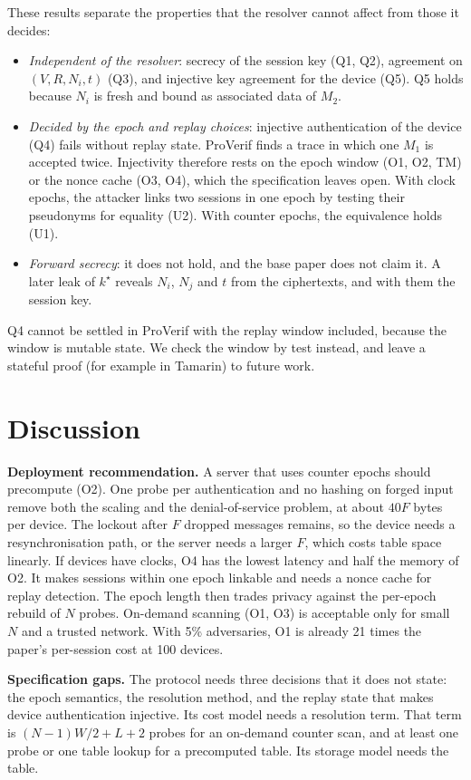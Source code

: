 These results separate the properties that the resolver cannot affect from those it decides:
\begin{itemize}
\item \emph{Independent of the resolver}: secrecy of the session key (Q1, Q2), agreement on $(V,R,N_i,t)$ (Q3), and
injective key agreement for the device (Q5). Q5 holds because $N_i$ is fresh and bound as associated data of $M_2$.
\item \emph{Decided by the epoch and replay choices}: injective authentication of the device (Q4) fails without replay
state. ProVerif finds a trace in which one $M_1$ is accepted twice. Injectivity therefore rests on the epoch window (O1,
O2, TM) or the nonce cache (O3, O4), which the specification leaves open. With clock epochs, the attacker links two
sessions in one epoch by testing their pseudonyms for equality (U2). With counter epochs, the equivalence holds (U1).
\item \emph{Forward secrecy}: it does not hold, and the base paper does not claim it. A later leak of $k^\star$ reveals
$N_i$, $N_j$ and $t$ from the ciphertexts, and with them the session key.
\end{itemize}
Q4 cannot be settled in ProVerif with the replay window included, because the window is mutable state. We check the
window by test instead, and leave a stateful proof (for example in Tamarin) to future work.
\fi

\section{Discussion}\label{sec:disc}
\textbf{Deployment recommendation.} A server that uses counter epochs should precompute (O2). One probe per
authentication and no hashing on forged input remove both the scaling and the denial-of-service problem, at about
$40F$ bytes per device. The lockout after $F$ dropped messages remains, so the device needs a resynchronisation path, or
the server needs a larger $F$, which costs table space linearly. If devices have clocks, O4 has the lowest latency and
half the memory of O2. It makes sessions within one epoch linkable and needs a nonce cache for replay detection. The
epoch length then trades privacy against the per-epoch rebuild of $N$ probes. On-demand scanning (O1, O3) is
acceptable only for small $N$ and a trusted network. With 5\% adversaries, O1 is already 21 times the paper's
per-session cost at 100 devices.

\textbf{Specification gaps.} The protocol needs three decisions that it does not state: the epoch
semantics, the resolution method, and the replay state that makes device authentication injective. Its cost model
needs a resolution term. That term is $(N-1)W/2+L+2$ probes for an on-demand counter scan, and at least one probe or
one table lookup for a precomputed table. Its storage model needs the table.

